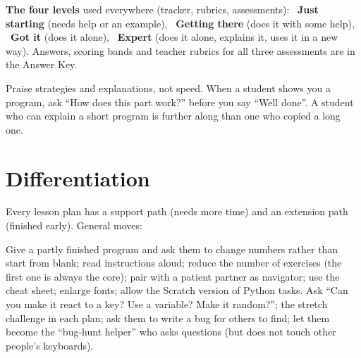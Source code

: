 \documentclass[level=1,teacher]{kidscode}
\begin{document}
\textbf{The four levels} used everywhere (tracker, rubrics, assessments):
\faSeedling\ \textbf{Just starting} (needs help or an example),
\faShoePrints\ \textbf{Getting there} (does it with some help),
\faCheckCircle\ \textbf{Got it} (does it alone),
\faRocket\ \textbf{Expert} (does it alone, explains it, uses it in a new way).
Answers, scoring bands and teacher rubrics for all three assessments are in the Answer Key.

\begin{tip}
Praise strategies and explanations, not speed. When a student shows you a program, ask
\enquote{How does this part work?} before you say \enquote{Well done}. A student who can explain a short
program is further along than one who copied a long one.
\end{tip}

\section{Differentiation}
Every lesson plan has a support path (needs more time) and an extension path (finished early). General moves:

\begin{differentiation}
\supportpath Give a partly finished program and ask them to change numbers rather than start from blank;
read instructions aloud; reduce the number of exercises (the first one is always the core); pair with a
patient partner as navigator; use the cheat sheet; enlarge fonts; allow the Scratch version of Python tasks.
\extensionpath Ask \enquote{Can you make it react to a key? Use a variable? Make it random?}; the
stretch challenge in each plan; ask them to write a bug for others to find; let them become the
\enquote{bug-hunt helper} who asks questions (but does not touch other people's keyboards).
\end{differentiation}
\end{document}
